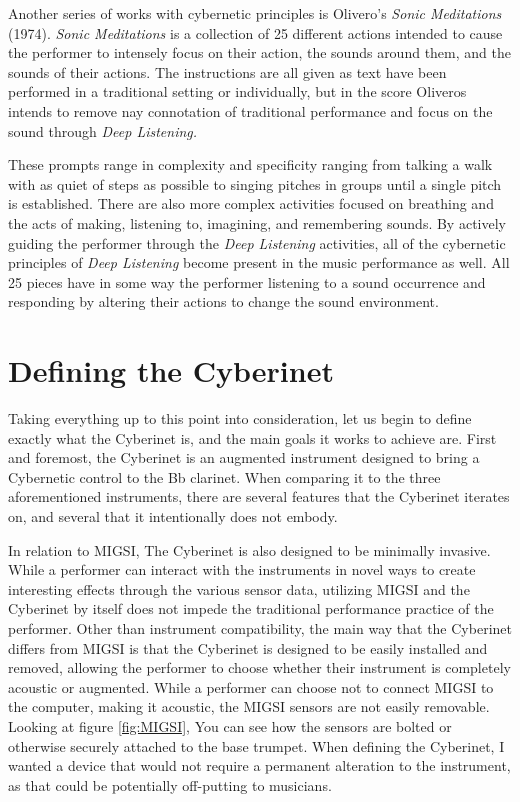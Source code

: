 Another series of works with cybernetic principles is Olivero's \textit{Sonic Meditations} (1974). \textit{Sonic Meditations} is a collection of 25 different actions intended to cause the performer to intensely focus on their action, the sounds around them, and the sounds of their actions\cite{OliverosMeditations}. The instructions are all given as text have been performed in a traditional setting or individually, but in the score Oliveros intends to remove nay connotation of traditional performance and focus on the sound through \textit{Deep Listening.} 

These prompts range in complexity and specificity ranging from talking a walk with as quiet of steps as possible to singing pitches in groups until a single pitch is established. There are also more complex activities focused on breathing and the acts of making, listening to, imagining, and remembering sounds\cite{OliverosMeditations}. By actively guiding the performer through the \textit{Deep Listening} activities, all of the cybernetic principles of \textit{Deep Listening} become present in the music performance as well. All 25 pieces have in some way the performer listening to a sound occurrence and responding by altering their actions to change the sound environment.

\section{Defining the Cyberinet}


Taking everything up to this point into consideration, let us begin to define exactly what the Cyberinet is, and the main goals it works to achieve are. First and foremost, the Cyberinet is an augmented instrument designed to bring a Cybernetic control to the Bb clarinet. When comparing it to the three aforementioned instruments, there are several features that the Cyberinet iterates on, and several that it intentionally does not embody.

In relation to MIGSI, The Cyberinet is also designed to be minimally invasive. While a performer can interact with the instruments in novel ways to create interesting effects through the various sensor data, utilizing MIGSI and the Cyberinet by itself does not impede the traditional performance practice of the performer. Other than instrument compatibility, the main way that the Cyberinet differs from MIGSI is that the Cyberinet is designed to be easily installed and removed, allowing the performer to choose whether their instrument is completely acoustic or augmented. While a performer can choose not to connect MIGSI to the computer, making it acoustic, the MIGSI sensors are not easily removable. Looking at figure \ref{fig:MIGSI}, You can see how the sensors are bolted or otherwise securely attached to the base trumpet. When defining the Cyberinet, I wanted a device that would not require a permanent alteration to the instrument, as that could be potentially off-putting to musicians. 

